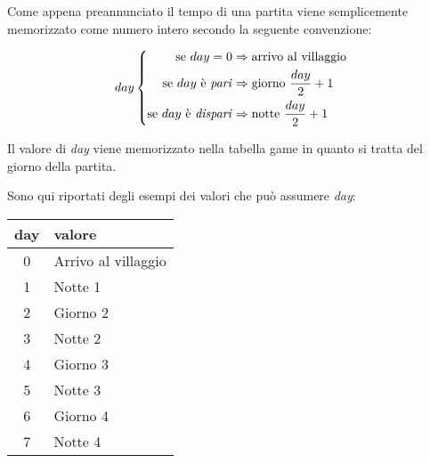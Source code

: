 Come appena preannunciato il tempo di una partita viene semplicemente memorizzato come numero intero secondo la seguente convenzione:

\[
day
\left\{
\begin{aligned}
\text{se}\ day = 0 						&\Rightarrow \text{arrivo al villaggio} \\
\text{se}\ day\ \text{è \emph{pari}}		&\Rightarrow \text{giorno}\ \frac{day}{2}+1 \\
\text{se}\ day\ \text{è \emph{dispari}}	&\Rightarrow \text{notte}\ \frac{day}{2}+1
\end{aligned}
\right.
\]

Il valore di \emph{day} viene memorizzato nella tabella game in quanto si tratta del giorno della partita.

Sono qui riportati degli esempi dei valori che può assumere \emph{day}:

\begin{tabular}{|c|l|}
	\hline
	\textbf{day} & \textbf{valore} \\
	\hline
	0 & Arrivo al villaggio \\
	1 & Notte 1 \\
	2 & Giorno 2 \\
	3 & Notte 2 \\
	4 & Giorno 3 \\
	5 & Notte 3 \\
	6 & Giorno 4 \\
	7 & Notte 4 \\
	\hline
\end{tabular}